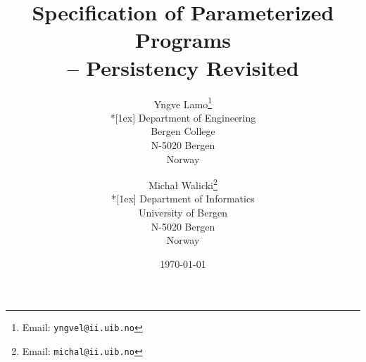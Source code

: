 \documentclass[10pt]{article}
\begin{document}

\title{Specification of Parameterized Programs\\ -- Persistency Revisited} 
\author{Yngve Lamo\thanks{Email: \texttt{yngvel@ii.uib.no}} \\*[1ex] Department of
Engineering \\ Bergen College \\  N-5020 Bergen \\ Norway
\and Micha{\l} Walicki\thanks{Email: \texttt{michal@ii.uib.no}} \\*[1ex] Department of
  Informatics \\ University of Bergen \\ N-5020 Bergen \\ Norway}


\date{\today}
\maketitle






\end{document}
